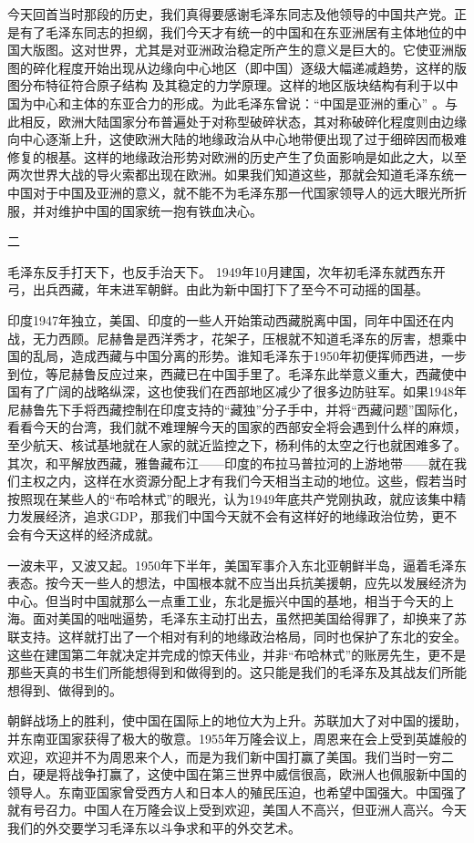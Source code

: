 \documentclass[UTF8, 12pt, a4paper]{ctexrep}
\begin{document}
今天回首当时那段的历史，我们真得要感谢毛泽东同志及他领导的中国共产党。正是有了毛泽东同志的担纲，我们今天才有统一的中国和在东亚洲居有主体地位的中国大版图。这对世界，尤其是对亚洲政治稳定所产生的意义是巨大的。它使亚洲版图的碎化程度开始出现从边缘向中心地区（即中国）逐级大幅递减趋势，这样的版图分布特征符合原子结构 及其稳定的力学原理。这样的地区版块结构有利于以中国为中心和主体的东亚合力的形成。为此毛泽东曾说：“中国是亚洲的重心” 。与此相反，欧洲大陆国家分布普遍处于对称型破碎状态，其对称破碎化程度则由边缘向中心逐渐上升，这使欧洲大陆的地缘政治从中心地带便出现了过于细碎因而极难修复的根基。这样的地缘政治形势对欧洲的历史产生了负面影响是如此之大，以至两次世界大战的导火索都出现在欧洲。如果我们知道这些，那就会知道毛泽东统一中国对于中国及亚洲的意义，就不能不为毛泽东那一代国家领导人的远大眼光所折服，并对维护中国的国家统一抱有铁血决心。

二

毛泽东反手打天下，也反手治天下。 1949年10月建国，次年初毛泽东就西东开弓，出兵西藏，年末进军朝鲜。由此为新中国打下了至今不可动摇的国基。

印度1947年独立，美国、印度的一些人开始策动西藏脱离中国，同年中国还在内战，无力西顾。尼赫鲁是西洋秀才，花架子，压根就不知道毛泽东的厉害，想乘中国的乱局，造成西藏与中国分离的形势。谁知毛泽东于1950年初便挥师西进，一步到位，等尼赫鲁反应过来，西藏已在中国手里了。毛泽东此举意义重大，西藏使中国有了广阔的战略纵深，这也使我们在西部地区减少了很多边防驻军。如果1948年尼赫鲁先下手将西藏控制在印度支持的“藏独”分子手中，并将“西藏问题”国际化，看看今天的台湾，我们就不难理解今天的国家的西部安全将会遇到什么样的麻烦，至少航天、核试基地就在人家的就近监控之下，杨利伟的太空之行也就困难多了。其次，和平解放西藏，雅鲁藏布江——印度的布拉马普拉河的上游地带——就在我们主权之内，这样在水资源分配上才有我们今天相当主动的地位。这些，假若当时按照现在某些人的“布哈林式”的眼光，认为1949年底共产党刚执政，就应该集中精力发展经济，追求GDP，那我们中国今天就不会有这样好的地缘政治位势，更不会有今天这样的经济成就。

一波未平，又波又起。1950年下半年，美国军事介入东北亚朝鲜半岛，逼着毛泽东表态。按今天一些人的想法，中国根本就不应当出兵抗美援朝，应先以发展经济为中心。但当时中国就那么一点重工业，东北是振兴中国的基地，相当于今天的上海。面对美国的咄咄逼势，毛泽东主动打出去，虽然把美国给得罪了，却换来了苏联支持。这样就打出了一个相对有利的地缘政治格局，同时也保护了东北的安全。这些在建国第二年就决定并完成的惊天伟业，并非“布哈林式”的账房先生，更不是那些天真的书生们所能想得到和做得到的。这只能是我们的毛泽东及其战友们所能想得到、做得到的。

朝鲜战场上的胜利，使中国在国际上的地位大为上升。苏联加大了对中国的援助，并东南亚国家获得了极大的敬意。1955年万隆会议上，周恩来在会上受到英雄般的欢迎，欢迎并不为周恩来个人，而是为我们新中国打赢了美国。我们当时一穷二白，硬是将战争打赢了，这使中国在第三世界中威信很高，欧洲人也佩服新中国的领导人。东南亚国家曾受西方人和日本人的殖民压迫，也希望中国强大。中国强了就有号召力。中国人在万隆会议上受到欢迎，美国人不高兴，但亚洲人高兴。今天我们的外交要学习毛泽东以斗争求和平的外交艺术。
\end{document}
